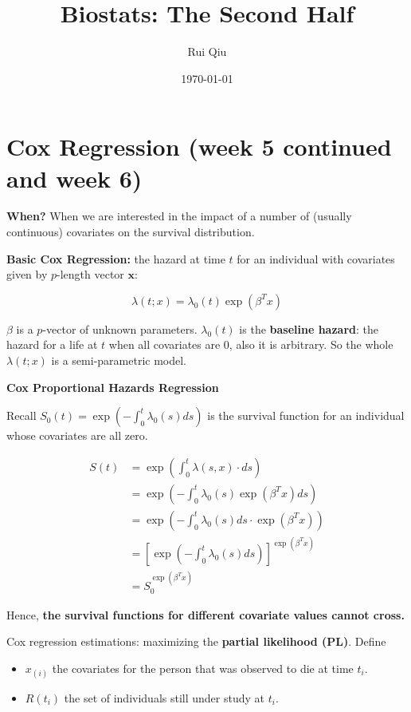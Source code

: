 \documentclass[a4paper]{article}
\title{Biostats: The Second Half}
\author{Rui Qiu}
\date{\today}
\begin{document}
\maketitle

\section{Cox Regression (week 5 continued and week 6)}

\textbf{When?} When we are interested in the impact of a number of (usually continuous) covariates on the survival distribution.

\textbf{Basic Cox Regression:} the hazard at time $t$ for an individual with covariates given by $p$-length vector $\mathbf{x}$:

$$\lambda(t;x)=\lambda_0(t)\exp(\beta^Tx)$$

$\beta$ is a $p$-vector of unknown parameters. $\lambda_0(t)$ is the \textbf{baseline hazard}: the hazard for a life at $t$ when all covariates are $0$, also it is arbitrary. So the whole $\lambda(t;x)$ is a semi-parametric model.

\textbf{Cox Proportional Hazards Regression}

Recall $S_0(t)=\exp\left(-\int^t_0\lambda_0(s)ds\right)$ is the survival function for an individual whose covariates are all zero. 

\begin{equation}
	\begin{split}
		S(t)&=\exp \left(\int^t_0\lambda(s,x)\cdot ds \right)\\
		&=\exp\left(-\int^t_0\lambda_0(s)\exp(\beta^T x)ds\right)\\
		&=\exp\left(-\int^t_0\lambda_0(s)ds\cdot\exp\left(\beta^Tx\right)\right)\\
		&=\left[\exp\left(-\int^t_0\lambda_0(s)ds\right)\right]^{\exp{(\beta^Tx)}}\\
		&=S_0^{\exp{(\beta^Tx)}}
	\end{split}
\end{equation}

Hence, \textbf{the survival functions for different covariate values cannot cross.}

Cox regression estimations: maximizing the \textbf{partial likelihood (PL)}. Define
\begin{itemize}
	\item $x_{(i)}$ the covariates for the person that was observed to die at time $t_i$.
	\item $R(t_i)$ the set of individuals still under study at $t_i$.
\end{itemize}
\end{document}
